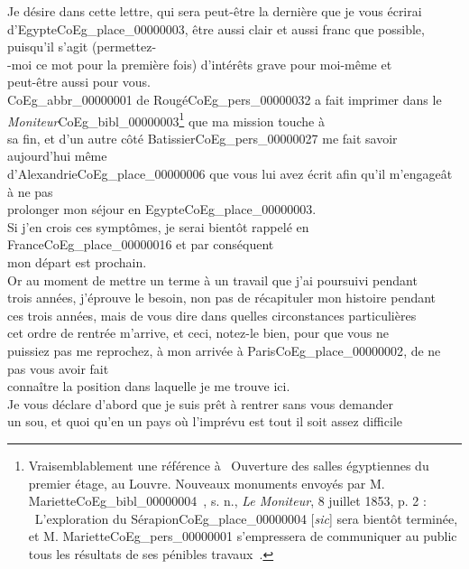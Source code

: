 \documentclass{book}
\begin{document}
Je désire dans cette lettre, qui sera peut-être la dernière que je vous écrirai\\
d’Egypte\gls{CoEg_place_00000003}, être aussi clair et aussi franc que possible, puisqu’il s’agit (permettez-\\
-moi ce mot pour la première fois) d’intérêts grave pour moi-même et\\
peut-être aussi pour vous.\\
\indent \gls{CoEg_abbr_00000001} de Rougé\gls{CoEg_pers_00000032} a fait imprimer dans le \textit{Moniteur}\gls{CoEg_bibl_00000003}\footnote{Vraisemblablement une référence à \og ~Ouverture des salles égyptiennes du premier étage, au Louvre. Nouveaux monuments envoyés par M. Mariette\gls{CoEg_bibl_00000004}~\fg, s. n., \textit{Le Moniteur}, 8 juillet 1853, p. 2 : \og ~L'exploration du Sérapion\gls{CoEg_place_00000004} {[\textit{sic}]} sera bientôt terminée, et M. Mariette\gls{CoEg_pers_00000001} s'empressera de communiquer au public tous les résultats de ses pénibles travaux~\fg.} que ma mission touche à\\
sa fin, et d’un autre côté Batissier\gls{CoEg_pers_00000027} me fait savoir aujourd’hui même\\
d’Alexandrie\gls{CoEg_place_00000006} que vous lui avez écrit afin qu’il m’engageât à ne pas\\
prolonger mon séjour en Egypte\gls{CoEg_place_00000003}.\\
\indent Si j’en crois ces symptômes, je serai bientôt rappelé en France\gls{CoEg_place_00000016} et par conséquent\\
mon départ est prochain.\\
\indent Or au moment de mettre un terme à un travail que j’ai poursuivi pendant\\
trois années, j’éprouve le besoin, non pas de récapituler mon histoire pendant\\
ces trois années, mais de vous dire dans quelles circonstances particulières\\
cet ordre de rentrée m’arrive, et ceci, notez-le bien, pour que vous ne\\
puissiez pas me reprochez, à mon arrivée à Paris\gls{CoEg_place_00000002}, de ne pas vous avoir fait\\
connaître la position dans laquelle je me trouve ici.\\
\indent Je vous déclare d’abord que je suis prêt à rentrer sans vous demander\\
un sou, et quoi qu’en un pays où l’imprévu est tout il soit assez difficile\\
\end{document}

